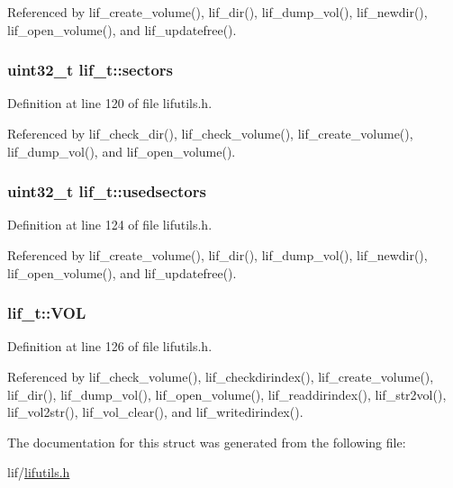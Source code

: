 Referenced by lif\+\_\+create\+\_\+volume(), lif\+\_\+dir(), lif\+\_\+dump\+\_\+vol(), lif\+\_\+newdir(), lif\+\_\+open\+\_\+volume(), and lif\+\_\+updatefree().

\subsubsection[{\texorpdfstring{sectors}{sectors}}]{\setlength{\rightskip}{0pt plus 5cm}uint32\+\_\+t lif\+\_\+t\+::sectors}\hypertarget{structlif__t_a262b14d8547abff49d9dd1b445faf6d5}{}\label{structlif__t_a262b14d8547abff49d9dd1b445faf6d5}


Definition at line 120 of file lifutils.\+h.



Referenced by lif\+\_\+check\+\_\+dir(), lif\+\_\+check\+\_\+volume(), lif\+\_\+create\+\_\+volume(), lif\+\_\+dump\+\_\+vol(), and lif\+\_\+open\+\_\+volume().

\subsubsection[{\texorpdfstring{usedsectors}{usedsectors}}]{\setlength{\rightskip}{0pt plus 5cm}uint32\+\_\+t lif\+\_\+t\+::usedsectors}\hypertarget{structlif__t_ad81767a2f65b997d5abecba130b89814}{}\label{structlif__t_ad81767a2f65b997d5abecba130b89814}


Definition at line 124 of file lifutils.\+h.



Referenced by lif\+\_\+create\+\_\+volume(), lif\+\_\+dir(), lif\+\_\+dump\+\_\+vol(), lif\+\_\+newdir(), lif\+\_\+open\+\_\+volume(), and lif\+\_\+updatefree().

\subsubsection[{\texorpdfstring{V\+OL}{VOL}}]{ lif\+\_\+t\+::\+V\+OL}\hypertarget{structlif__t_ae68126d2b9261ef9a6903a95d5c82cac}{}\label{structlif__t_ae68126d2b9261ef9a6903a95d5c82cac}


Definition at line 126 of file lifutils.\+h.



Referenced by lif\+\_\+check\+\_\+volume(), lif\+\_\+checkdirindex(), lif\+\_\+create\+\_\+volume(), lif\+\_\+dir(), lif\+\_\+dump\+\_\+vol(), lif\+\_\+open\+\_\+volume(), lif\+\_\+readdirindex(), lif\+\_\+str2vol(), lif\+\_\+vol2str(), lif\+\_\+vol\+\_\+clear(), and lif\+\_\+writedirindex().



The documentation for this struct was generated from the following file\+:\begin{DoxyCompactItemize}
\item 
lif/\hyperlink{lifutils_8h}{lifutils.\+h}\end{DoxyCompactItemize}
